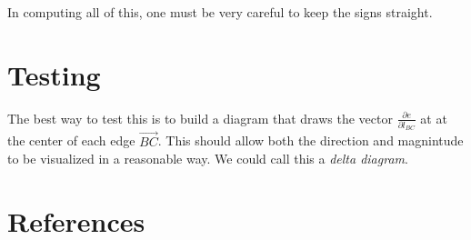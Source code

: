 \documentclass[11pt]{article}
\begin{document}
In computing all of this, one must be very careful to keep the signs straight.








\section{Testing}

The best way to test this is to build a diagram that draws the vector $\frac{\partial e}{\partial l_{BC}}$ at at the center
of each edge $\vec{BC}$. This should allow both the direction and magnintude to be visualized in a reasonable way.
We could call this a {\em delta diagram}.

  


\section{References}
\end{document}
